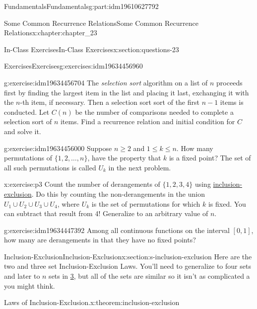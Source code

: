 \documentclass[oneside,10pt,]{book}
\numberwithin{equation}{section}
\begin{document}
\begin{partptx}{Fundamentals}{}{Fundamentals}{}{}{g:part:idm19610627792}
\begin{chapterptx}{Some Common Recurrence Relations}{}{Some Common Recurrence Relations}{}{}{x:chapter:chapter_23}
\begin{sectionptx}{In-Class Exercises}{}{In-Class Exercises}{}{}{x:section:questions-23}
\begin{exercises-subsection-numberless}{Exercises}{}{Exercises}{}{}{g:exercises:idm19634456960}
\begin{exercisegroup}
\begin{divisionexerciseeg}{1}{}{}{g:exercise:idm19634456704}
The \emph{selection sort} algorithm on a list of \(n\) proceeds first by finding the largest item in the list and placing it last, exchanging it with the \(n\)-th item, if necessary.  Then a selection sort sort of the first \(n-1\) items is conducted. Let \(C(n)\) be the number of comparisons needed to complete a selection sort of \(n\) items.   Find a recurrence relation and initial condition for \(C\) and solve it.%
\end{divisionexerciseeg}%
\begin{divisionexerciseeg}{2}{}{}{g:exercise:idm19634456000}%
Suppose \(n \geq 2\) and \(1 \leq k \leq n\).  How many permutations of \(\{1,2, \dots ,n\}\),  have the property that \(k\) is a fixed point?  The set of all such permutations is called \(U_k\) in the next problem.%
\end{divisionexerciseeg}%
\begin{divisionexerciseeg}{3}{}{}{x:exercise:p3}%
Count the number of derangements of \(\{1,2,3,4\}\) using \hyperref[x:section:s-inclusion-exclusion]{inclusion-exclusion}. Do this by counting the non-derangements in the union \(U_1 \cup U_2 \cup U_3 \cup U_4\), where \(U_k\) is the set of permutations for which \(k\) is fixed. You can subtract that result from 4!   Generalize to an arbitrary value of \(n\).%
\end{divisionexerciseeg}%
\begin{divisionexerciseeg}{4}{}{}{g:exercise:idm19634447392}%
Among all continuous functions on the interval \([0,1]\), how many are derangements in that they have no fixed points?%
\end{divisionexerciseeg}%
\end{exercisegroup}
\par\medskip\noindent
\end{exercises-subsection-numberless}
\end{sectionptx}
%
%
\typeout{************************************************}
\typeout{************************************************}
%
\begin{sectionptx}{Inclusion-Exclusion}{}{Inclusion-Exclusion}{}{}{x:section:s-inclusion-exclusion}
Here are the two and three set Inclusion-Exclusion Laws. You'll need to generalize to four sets and later to \(n\) sets in \hyperlink{x:exercise:p3}{3}, but all of the sets are similar so it isn't as complicated a you might think.%
\begin{theorem}{Laws of Inclusion-Exclusion.}{}{x:theorem:inclusion-exclusion}%
%

\end{theorem}
\end{sectionptx}
\end{chapterptx}
\end{partptx}
\end{document}
